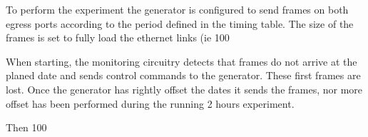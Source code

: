 To perform the experiment the generator is configured to send frames on both egress ports according to the period defined in the timing table. The size of the frames is set to fully load the ethernet links (ie 100%

When starting, the monitoring circuitry detects that frames do not arrive at the planed date and sends control commands to the generator. These first frames are lost. Once the generator has rightly offset the dates it sends the frames, nor more offset has been performed during the running 2 hours experiment.

Then 100%
